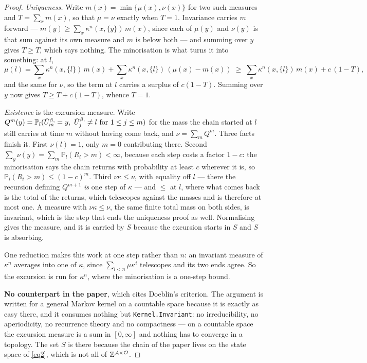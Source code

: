\begin{proof}
  \leanok
  \emph{Uniqueness.}  Write $m(x) = \min\{\mu(x), \nu(x)\}$ for two such
  measures and $T = \sum_x m(x)$, so that $\mu = \nu$ exactly when $T = 1$.
  Invariance carries $m$ forward --- $m(y) \ge \sum_x \kappa^n(x,\{y\})\, m(x)$,
  since each of $\mu(y)$ and $\nu(y)$ is that sum against its own measure and
  $m$ is below both --- and summing over $y$ gives $T \ge T$, which says
  nothing.  The minorisation is what turns it into something: at $l$,
  \[
    \mu(l) = \sum_x \kappa^n(x,\{l\})\, m(x)
      + \sum_x \kappa^n(x,\{l\})\, (\mu(x) - m(x))
      \;\ge\; \sum_x \kappa^n(x,\{l\})\, m(x) + c\,(1 - T),
  \]
  and the same for $\nu$, so the term at $l$ carries a surplus of $c(1-T)$.
  Summing over $y$ now gives $T \ge T + c(1-T)$, whence $T = 1$.

  \emph{Existence} is the excursion measure.  Write
  $Q^m(y) = \mathbb{P}_l(\tilde{U}^{\beta,}_m = y,\ \tilde{U}^{\beta,}_j \ne l \text{ for }
  1 \le j \le m)$ for the mass the chain started at $l$ still carries at time
  $m$ without having come back, and $\nu = \sum_m Q^m$.  Three facts finish it.
  First $\nu(l) = 1$, only $m = 0$ contributing there.  Second
  $\sum_y \nu(y) = \sum_m \mathbb{P}_l(R_l > m) < \infty$, because each step
  costs a factor $1 - c$: the minorisation says the chain returns with
  probability at least $c$ wherever it is, so $\mathbb{P}_l(R_l > m) \le
  (1-c)^m$.  Third $\nu \kappa \le \nu$, with equality off $l$ --- there the
  recursion defining $Q^{m+1}$ \emph{is} one step of $\kappa$ --- and $\le$ at
  $l$, where what comes back is the total of the returns, which telescopes
  against the masses and is therefore at most one.  A measure with $\nu\kappa
  \le \nu$, the same finite total mass on both sides, is invariant, which is
  the step that ends the uniqueness proof as well.  Normalising gives the
  measure, and it is carried by $S$ because the excursion starts in $S$ and $S$
  is absorbing.

  One reduction makes this work at one step rather than $n$: an invariant
  measure of $\kappa^n$ averages into one of $\kappa$, since
  $\sum_{i<n} \mu\kappa^{i}$ telescopes and its two ends agree.  So the
  excursion is run for $\kappa^n$, where the minorisation is a one-step bound.

  \textbf{No counterpart in the paper}, which cites Doeblin's criterion.  The
  argument is written for a general Markov kernel on a countable space because
  it is exactly as easy there, and it consumes nothing but
  \texttt{Kernel.Invariant}: no irreducibility, no aperiodicity, no recurrence
  theory and no compactness --- on a countable space the excursion measure is a
  sum in $[0,\infty]$ and nothing has to converge in a topology.  The set $S$ is
  there because the chain of the paper lives on the state space of \ref{eq2},
  which is not all of $\mathbb{Z}^{\mathcal{A} \times \mathcal{O}}$.
\end{proof}


